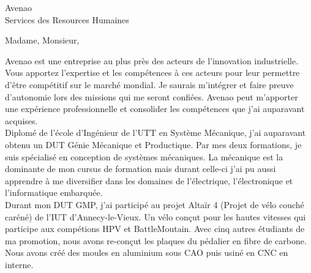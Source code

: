 \documentclass[a4paper,10pt,firstfoot=false]{scrlttr2}
\begin{document}


\begin{letter}{Avenao \\ Services des Resources Humaines}

\pagestyle{empty}
\opening{Madame, Monsieur,}

Avenao est une entreprise au plus près des acteurs de l'innovation industrielle. Vous apportez l'expertise et les compétences à ces acteurs pour leur permettre d'être compétitif sur le marché mondial. Je saurais m'intégrer et faire preuve d'autonomie lors des missions qui me seront confiées. Avenao peut m'apporter une expérience professionnelle et consolider les compétences que j'ai auparavant acquises.\\

Diplomé de l’école d’Ingénieur de l’UTT en Système Mécanique, j’ai auparavant obtenu un DUT Génie Mécanique et Productique. Par mes deux formations, je suis spécialisé en conception de systèmes mécaniques. La mécanique est la dominante de mon cursus de formation mais durant celle-ci j’ai pu aussi apprendre à me diversifier dans les domaines de l’électrique, l’électronique et l’informatique embarquée.\\

Durant mon DUT GMP, j’ai participé au projet Altaïr 4 (Projet de vélo couché caréné) de l’IUT d’Annecy-le-Vieux. Un vélo conçut pour les hautes vitesses qui participe aux compétions HPV et BattleMoutain. Avec cinq autres étudiants de ma promotion, nous avons re-conçut les plaques du pédalier en fibre de carbone. Nous avons créé des moules en aluminium sous CAO puis usiné en CNC en interne.\\



\end{letter}
\end{document}
